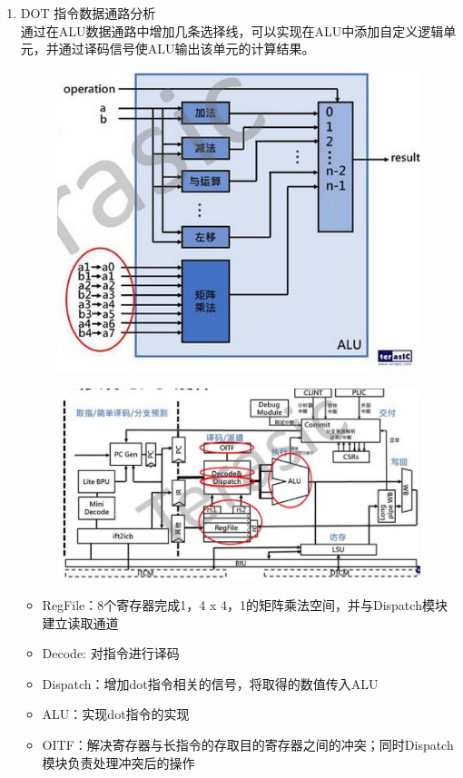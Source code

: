 \documentclass[a4paper, 14pt, oneside]{book} %
\numberwithin{equation}{subsection}
\begin{document}
\begin{enumerate}
			\item DOT 指令数据通路分析 \\
			通过在ALU数据通路中增加几条选择线，可以实现在ALU中添加自定义逻辑单元，并通过译码信号使ALU输出该单元的计算结果。
			\begin{figure}[H]
				\centering
				\includegraphics[scale=0.8]{img/alu2.png}
			\end{figure}
			\begin{figure}[H]
				\centering
				\includegraphics[scale=0.8]{img/datalink.jpg}
			\end{figure}
			\begin{itemize}
				\item RegFile：8个寄存器完成1，4 x 4，1的矩阵乘法空间，并与Dispatch模块建立读取通道
				\item Decode: 对指令进行译码
				\item Dispatch：增加dot指令相关的信号，将取得的数值传入ALU
				\item ALU：实现dot指令的实现
				\item OITF：解决寄存器与长指令的存取目的寄存器之间的冲突；同时Dispatch模块负责处理冲突后的操作
			\end{itemize}
		\end{enumerate}
		
\end{document}
